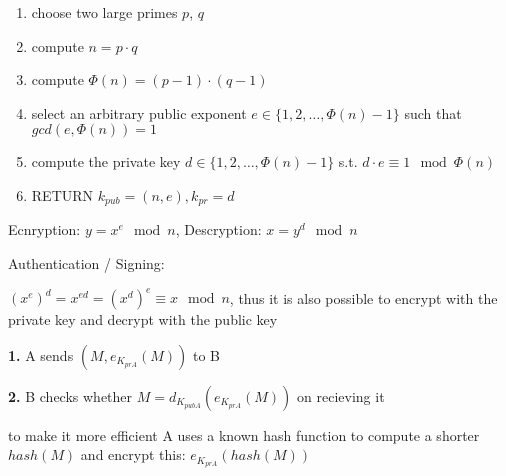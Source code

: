 \documentclass[landscape, a4paper]{article}
\begin{document}
\begin{minipage}[t]{0.198\pagewidth}
\begin{betterlist}
		\begin{enumerate}
			\item choose two large primes $p$, $q$
			\item compute $n = p \cdot q$
			\item compute $\Phi(n) = (p - 1) \cdot (q - 1)$
			\item select an arbitrary public exponent $e \in \{1, 2, \ldots, \Phi(n) - 1\}$ such that $gcd(e, \Phi(n) ) = 1$
			\item compute the private key $d \in \{1, 2, \ldots , \Phi(n) - 1\}$ s.t. $d \cdot e \equiv 1 \mod \Phi(n)$
			\item RETURN $k_{pub} = (n, e), k_{pr} = d$
		\end{enumerate}
		\item \alert{Ecnryption:} $y = x^e \mod n$, \alert{Descryption:} $x = y^d \mod n$
		\item \alert{Authentication / Signing:}
		\begin{betterlist}
			\item $(x^e)^d = x^{ed} = (x^d)^e \equiv x \mod n$, thus it is also possible to encrypt with the private key and decrypt with the public key
			\item[\color{PrimaryColor}\textbf{1.} ] A sends $(M, e_{K_{prA}}(M))$ to B
			\item[\color{PrimaryColor}\textbf{2.} ] B checks whether $M = d_{K_{pubA}}(e_{K_{prA}}(M))$ on recieving it
			\item to make it more efficient A uses a known hash function to compute a shorter $hash(M)$ and encrypt this: $e_{K_{prA}}(hash(M))$

\end{betterlist}
\end{betterlist}
\end{minipage}
\end{document}
